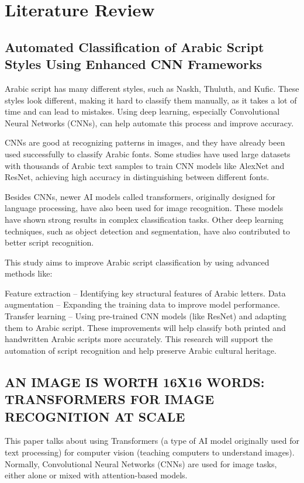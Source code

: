 \documentclass{article}
\begin{document}
\section{Literature Review}
\subsection{Automated Classification of Arabic Script Styles 
				Using Enhanced CNN Frameworks}
Arabic script has many different styles, such as Naskh, Thuluth, and Kufic. These styles look different, making it hard to classify them manually, as it takes a lot of time and can lead to mistakes. Using deep learning, especially Convolutional Neural Networks (CNNs), can help automate this process and improve accuracy.

CNNs are good at recognizing patterns in images, and they have already been used successfully to classify Arabic fonts. Some studies have used large datasets with thousands of Arabic text samples to train CNN models like AlexNet and ResNet, achieving high accuracy in distinguishing between different fonts.

Besides CNNs, newer AI models called transformers, originally designed for language processing, have also been used for image recognition. These models have shown strong results in complex classification tasks. Other deep learning techniques, such as object detection and segmentation, have also contributed to better script recognition.

This study aims to improve Arabic script classification by using advanced methods like:

Feature extraction – Identifying key structural features of Arabic letters.
Data augmentation – Expanding the training data to improve model performance.
Transfer learning – Using pre-trained CNN models (like ResNet) and adapting them to Arabic script.
These improvements will help classify both printed and handwritten Arabic scripts more accurately. This research will support the automation of script recognition and help preserve Arabic cultural heritage.
\subsection{AN IMAGE IS WORTH 16X16 WORDS: TRANSFORMERS FOR IMAGE RECOGNITION AT SCALE}
This paper talks about using Transformers (a type of AI model originally used for text processing) for computer vision (teaching computers to understand images). Normally, Convolutional Neural Networks (CNNs) are used for image tasks, either alone or mixed with attention-based models.
\end{document}
